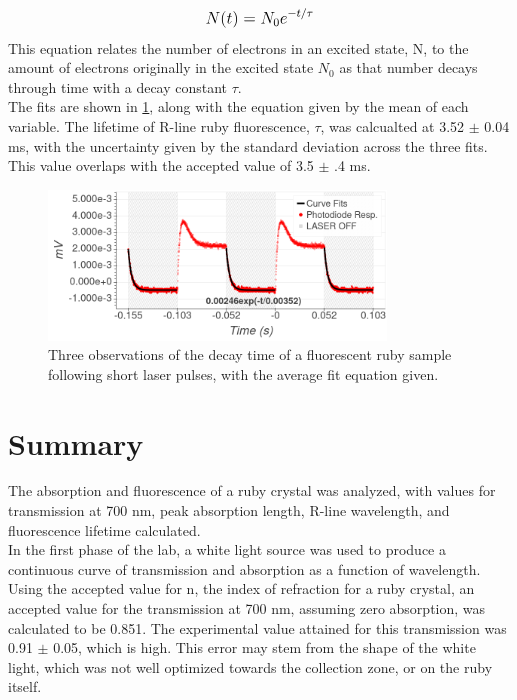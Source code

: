 \documentclass[aps,prl,reprint]{revtex4-2}
\begin{document}
\begin{equation}
	\mathlarger{N(t) = N_0e^{-t/\tau}}
	\label{N_0}
\end{equation}
This equation relates the number of electrons in an excited state, N, to the amount
of electrons originally in the excited state $N_0$ as that number decays through time
with a decay constant $\tau$. \\

The fits are shown in \ref{fits}, along with the equation given by the mean of each
variable. The lifetime of R-line ruby fluorescence, $\tau$, was calcualted at 3.52 $\pm$
0.04 ms, with the uncertainty given by the standard deviation across the three fits. 
This value overlaps with the accepted value of 3.5 $\pm$ .4 ms.

\begin{widetext}
\begin{center}
\begin{figure}[t]
	\includegraphics[width=0.8\textwidth]{../Images/l3_E.png}
	\caption{\label{fits} Three observations of the decay time of a fluorescent
	ruby sample following short laser pulses, with the average fit equation given.}
\end{figure}
\end{center}
\end{widetext}


\section{Summary}
The absorption and fluorescence of a ruby crystal was analyzed, with values for 
transmission at 700 nm, peak absorption length, R-line wavelength, and fluorescence 
lifetime calculated.\\

In the first phase of the lab, a white light source was used to produce a continuous 
curve of transmission and absorption as a function of wavelength. Using the accepted 
value for n, the index of refraction for a ruby crystal, an accepted value for the
transmission at 700 nm, assuming zero absorption, was calculated to be 0.851. The 
experimental value attained for this transmission was 0.91 $\pm$ 0.05, which is high. 
This error may stem from the shape of the white light, which was not well optimized 
towards the collection zone, or on the ruby itself. \\
\end{document}
